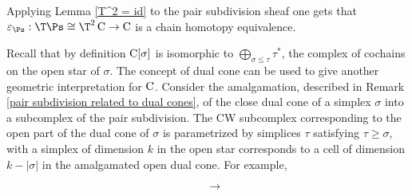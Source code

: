 \documentclass[thesis.tex]{subfiles}
\begin{document}
\begin{remark}\label{dual of pair subdivision related to relative dual cones}
Applying Lemma \ref{T^2 = id} to the pair subdivision sheaf one gets that $\varepsilon_{\Ps}:\T \Ps\cong \T^2\cochains\to \cochains$ is a chain homotopy equivalence.

Recall that by definition $\operatorname{C}[\sigma]$ is isomorphic to $\bigoplus_{\sigma\leq\tau}\tau^*$, the complex of cochains on the open star of $\sigma$. The concept of dual cone can be used to give another geometric interpretation for $\operatorname{C}$. Consider the amalgamation, described in Remark \ref{pair subdivision related to dual cones}, of the close dual cone of a simplex $\sigma$ into a subcomplex of the pair subdivision. The CW subcomplex corresponding to the open part of the dual cone of $\sigma$ is parametrized by simplices $\tau$ satisfying $\tau\geq\sigma$, with a simplex of dimension $k$ in the open star corresponds to a cell of dimension $k-|\sigma|$ in the amalgamated open dual cone. For example, \vspace*{6pt}

\begin{minipage}{4cm}
\begin{center}\hspace*{1.7cm}
\end{center}
\end{minipage}
\begin{minipage}{3cm}
\vspace*{-.6cm}$$\ \ \ \ \ \ \longrightarrow$$
\end{minipage}
\begin{minipage}{5cm}
\begin{center}
\end{center}
\end{minipage}
\end{remark}
\end{document}
